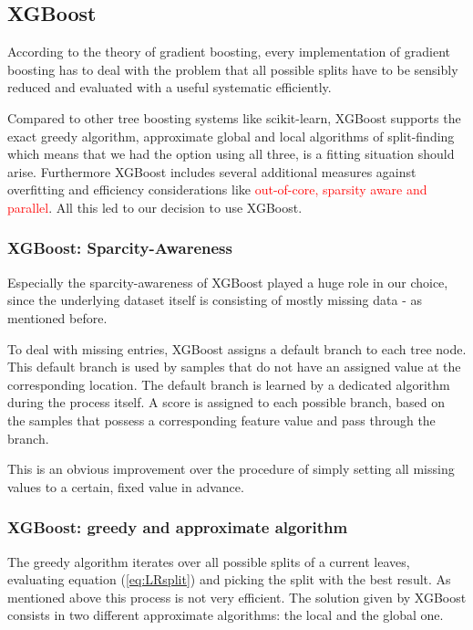 \subsection{XGBoost}\label{subsec:xgb}

According to the theory of gradient boosting, every implementation of gradient boosting has to deal with the problem that all possible splits have to be sensibly reduced and evaluated with a useful systematic  efficiently.

Compared to other tree boosting systems like scikit-learn, XGBoost supports the exact greedy algorithm, approximate global and local algorithms of split-finding which means that we had the option using all three, is a fitting situation should arise. Furthermore XGBoost includes several additional measures against overfitting and efficiency considerations like \textcolor{red}{out-of-core, sparsity aware and parallel}.  All this led to our decision to use XGBoost.

\subsubsection{XGBoost: Sparcity-Awareness}

Especially the sparcity-awareness of XGBoost played a huge role in our choice, since the underlying dataset itself is consisting of mostly missing data - as mentioned before.

To deal with missing entries, XGBoost assigns a default branch to each tree node. This default branch is used by samples that do not have an assigned value at the corresponding location. The default branch is learned by a dedicated algorithm during the process itself. A score is assigned to each possible branch, based on the samples that possess a corresponding feature value and pass through the branch.

This is an obvious improvement over the procedure of simply setting all missing values to a certain, fixed value in advance.

\subsubsection{XGBoost: greedy and approximate algorithm}
The greedy algorithm iterates over all possible splits of a current leaves, evaluating equation (\ref{eq:LRsplit}) and picking the split with the best result. As mentioned above this process is not very efficient. The solution given by XGBoost consists in two different approximate algorithms: the local and the global one.

